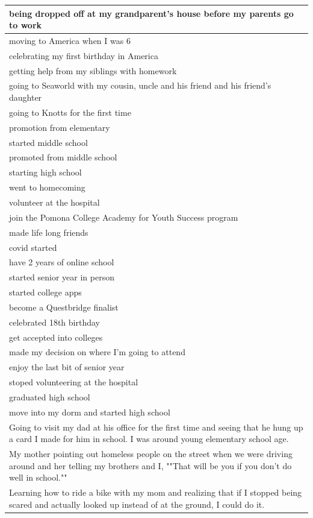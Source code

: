 \documentclass[
  .7em,
  letterpaper,
  DIV=11,
  numbers=noendperiod]{scrartcl}
\begin{document}
\begin{table}
\begin{tabular}{l}
\hline
being dropped off at my grandparent's house before my parents go to work\\
\hline
moving to America when I was 6\\
\hline
celebrating my first birthday in America\\
\hline
getting help from my siblings with homework\\
\hline
going to Seaworld with my cousin, uncle and his friend and his friend's daughter\\
\hline
going to Knotts for the first time\\
\hline
promotion from elementary\\
\hline
started middle school\\
\hline
promoted from middle school\\
\hline
starting high school\\
\hline
went to homecoming\\
\hline
volunteer at the hospital\\
\hline
join the Pomona College Academy for Youth Success program\\
\hline
made life long friends\\
\hline
covid started\\
\hline
have 2 years of online school\\
\hline
started senior year in person\\
\hline
started college apps\\
\hline
become a Questbridge finalist\\
\hline
celebrated 18th birthday\\
\hline
get accepted into colleges\\
\hline
made my decision on where I'm going to attend\\
\hline
enjoy the last bit of senior year\\
\hline
stoped volunteering at the hospital\\
\hline
graduated high school\\
\hline
move into my dorm and started high school\\
\hline
Going to visit my dad at his office for the first time and seeing that he hung up a card I made for him in school. I was around young elementary school age.\\
\hline
My mother pointing out homeless people on the street when we were driving around and her telling my brothers and I, ""That will be you if you don't do well in school.""\\
\hline
Learning how to ride a bike with my mom and realizing that if I stopped being scared and actually looked up instead of at the ground, I could do it.\\

\end{tabular}
\end{table}
\end{document}
